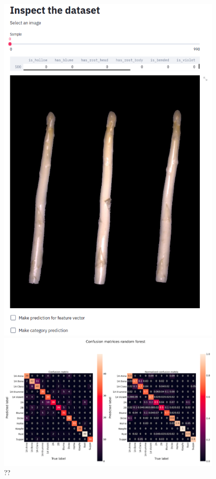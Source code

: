 \begin{figure}[H]
	\centering
	\includegraphics[scale=0.4]{Figures/chapter04/ftl_streamlit_app.png}
	\decoRule
	\caption[??]{??}
	\label{fig:FeaturetoLabelStreamlitApp}
	\centering
	\vspace{1cm}
	\includegraphics[scale=0.4]{Figures/chapter04/ftl_confusion_recall_random_forest.png}
	\decoRule
	\caption[??]{??}
	\label{fig:FeatureToLabelRandomForest}
\end{figure}

